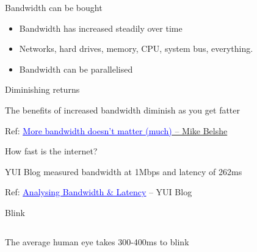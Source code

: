 \documentclass{beamer}
\begin{document}
\begin{frame}{Bandwidth can be bought}
  \begin{itemize}
  \item Bandwidth has increased steadily over time
  \item Networks, hard drives, memory, CPU, system bus, everything.
  \item Bandwidth can be parallelised
  \end{itemize}
\end{frame}

\begin{frame}{Diminishing returns}
  \begin{center}
  The benefits of increased bandwidth diminish as you get fatter
  \end{center}
  \parbox[c][1.2\paperheight]{\paperwidth}{}
  \tiny{Ref: \href{http://www.belshe.com/2010/05/24/more-bandwidth-doesnt-matter-much/}{\textcolor{blue}{\underline{More bandwidth doesn't matter (much)}} -- Mike Belshe}}
\end{frame}

\begin{frame}{How fast is the internet?}
  \begin{center}
  YUI Blog measured bandwidth at 1Mbps and latency of 262ms
  \end{center}
  \parbox[c][\paperheight]{\paperwidth}{ }
  \hfill \tiny{Ref: \href{http://www.yuiblog.com/blog/2010/04/08/analyzing-bandwidth-and-latency/}{\textcolor{blue}{\underline{Analysing Bandwidth \& Latency}}} -- YUI Blog}
\end{frame}

\begin{frame}{Blink}
  \begin{columns}[t]
    \begin{center}
    The average human eye takes 300-400ms to blink
    \end{center}
  \end{columns}
\end{frame}
\end{document}
